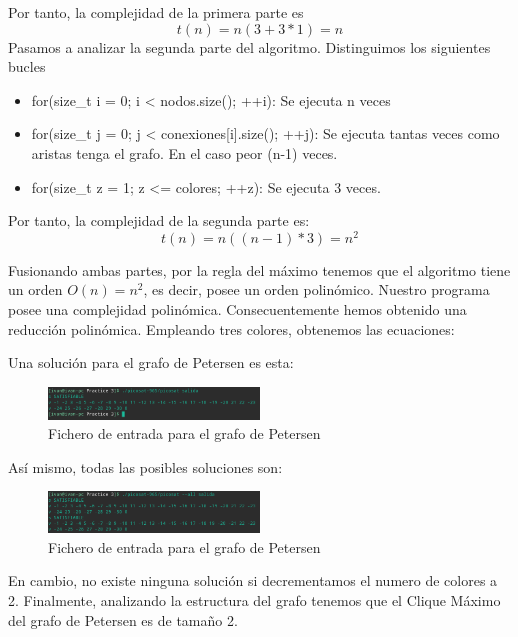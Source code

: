 \documentclass{article}
\begin{document}
    Por tanto, la complejidad de la primera parte es 
    \[t(n) = n(3+3*1) = n\]
    Pasamos a analizar la segunda parte del algoritmo. Distinguimos los siguientes bucles
    \begin{itemize}
        \item for(size_t i = 0; i < nodos.size(); ++i): Se ejecuta n veces
        \item for(size_t j = 0; j < conexiones[i].size(); ++j): Se ejecuta tantas veces como aristas tenga el grafo. En el caso peor (n-1) veces.
        \item for(size_t z = 1; z <= colores; ++z): Se ejecuta 3 veces.
    \end{itemize}
    
    Por tanto, la complejidad de la segunda parte es:
    \[t(n) = n((n-1)*3) = n^2\]
    
    Fusionando ambas partes, por la regla del máximo tenemos que el algoritmo tiene un orden $O(n) = n^2$, es decir, posee un orden polinómico. Nuestro programa posee una complejidad polinómica. Consecuentemente hemos obtenido una reducción polinómica.
    Empleando tres colores, obtenemos las ecuaciones: 
    
    Una solución para el grafo de Petersen es esta: 
    \begin{figure}[H]
            \centering
            \includegraphics[width=0.5\textwidth]{pictures/solution.png}
            \caption{Fichero de entrada para el grafo de Petersen}
        \end{figure}
        
    Así mismo, todas las posibles soluciones son: 
    \begin{figure}[H]
            \centering
            \includegraphics[width=0.5\textwidth]{pictures/solution_all.png}
            \caption{Fichero de entrada para el grafo de Petersen}
    \end{figure}
        
    En cambio, no existe ninguna solución si decrementamos el numero de colores a 2.
    Finalmente, analizando la estructura del grafo tenemos que el Clique Máximo del grafo de Petersen es de tamaño 2.  
\end{document}
